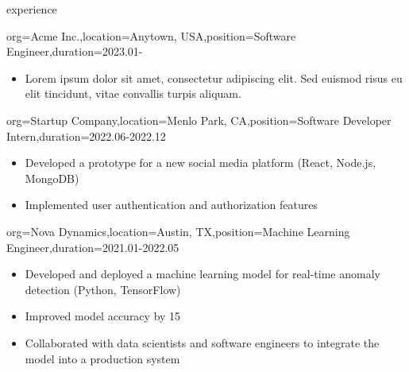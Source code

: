\documentclass{resume}
\begin{document}
\makeheader  %

\begin{ResumeSection}{experience}
    \begin{ResumeSubsection}{org=Acme Inc.,location={Anytown, USA},position={Software Engineer},duration={2023.01-}}
        \begin{itemize}
            \item Lorem ipsum dolor sit amet, consectetur adipiscing elit. Sed euismod risus eu elit tincidunt, vitae convallis turpis aliquam.  %
        \end{itemize}
    \end{ResumeSubsection}
    \begin{ResumeSubsection}{org=Startup Company,location={Menlo Park, CA},position={Software Developer Intern},duration={2022.06-2022.12}}
        \begin{itemize}
            \item Developed a prototype for a new social media platform (React, Node.js, MongoDB)  %
            \item Implemented user authentication and authorization features  %
        \end{itemize}
    \end{ResumeSubsection}
    \begin{ResumeSubsection}{org=Nova Dynamics,location={Austin, TX},position={Machine Learning Engineer},duration={2021.01-2022.05}}
        \begin{itemize}
            \item Developed and deployed a machine learning model for real-time anomaly detection (Python, TensorFlow)  %
            \item Improved model accuracy by 15%
            \item Collaborated with data scientists and software engineers to integrate the model into a production system  %
        \end{itemize}
    \end{ResumeSubsection}


\end{ResumeSection}
\end{document}

